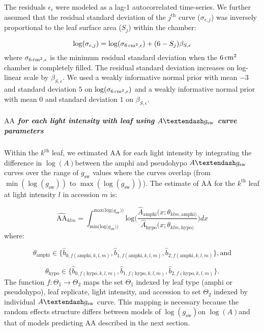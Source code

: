 \documentclass[
  letterpaper,
  DIV=11,
  numbers=noendperiod]{scrartcl}
\let\oldsubparagraph\subparagraph
\renewcommand{\subparagraph}[1]{\oldsubparagraph{#1}\mbox{}}
\newcommand{\aax}{$\mathrm{AA}$}
\newcommand{\agcurve}{$A \textendash g_\text{sw}$}
\newcommand{\gsw}{$g_\text{sw}$}
\newcommand{\loggsw}{$\log(g_\text{sw})$}
\newcommand{\logA}{$\log(A)$}
\begin{document}
The residuals \(\epsilon_{i}\) were modeled as a lag-1 autocorrelated
time-series. We further assumed that the residual standard deviation of
the \(j^{\text{th}}\) curve (\(\sigma_{\epsilon,j}\)) was inversely
proportional to the leaf surface area (\(S_j\)) within the chamber:

\[\log (\sigma_{\epsilon,j}) = \log (\sigma_{\qty{6}{\raiseto{2}\centi\meter},\epsilon}) + (6 - S_j) \beta_{S,\epsilon}\]
where \(\sigma_{\qty{6}{\raiseto{2}\centi\meter},\epsilon}\) is the
minimum residual standard deviation when the
\(\qty{6}{\raiseto{2}\centi\meter}\) chamber is completely filled. The
residual standard deviation increases on log-linear scale by
\(\beta_{S,\epsilon}\). We used a weakly informative normal prior with
mean \(-3\) and standard deviation \(5\) on
\(\log (\sigma_{\qty{6}{\raiseto{2}\centi\meter},\epsilon})\) and a
weakly informative normal prior with mean \(0\) and standard deviation
\(1\) on \(\beta_{S,\epsilon}\).

\subparagraph{\texorpdfstring{\aax{} for each light intensity with leaf
using \agcurve{} curve
parameters}{ for each light intensity with leaf using  curve parameters}}\label{for-each-light-intensity-with-leaf-using-curve-parameters}

Within the \(k^{\text{th}}\) leaf, we estimated \aax{} for each light
intensity by integrating the difference in \logA between the amphi and
pseudohypo \agcurve{} curves over the range of \gsw{} values where the
curves overlap (from \(\min(\log(g_\text{sw}))\) to
\(\max(\log(g_\text{sw}))\)). The estimate of \aax{} for the
\(k^{\text{th}}\) leaf at light intensity \(l\) in accession \(m\) is:

\[\widehat{\mathrm{AA}}_{klm} = \int_{\text{min(log(}g_\text{sw}))}^{\text{max(log(}g_\text{sw}))} \text{log}\bigg(\frac{\hat{A}_\text{amphi}(x; \theta_{klm,\text{amphi})}}{\hat{A}_\text{hypo}(x; \theta_{klm,\text{hypo})}}\bigg) dx\]
where:

\[\theta_\text{amphi} \in \{\hat{b}_{0, f(\text{amphi}, k,l,m)}, \hat{b}_{1, f(\text{amphi}, k,l,m)}, \hat{b}_{2, f(\text{amphi}, k,l,m)}\}, \text{and}\]

\[\theta_\text{hypo} \in \{\hat{b}_{0, f(\text{hypo}, k,l,m)}, \hat{b}_{1, f(\text{hypo}, k,l,m)}, \hat{b}_{2, f(\text{hypo}, k,l,m)}\}.\]
The function \(f : \Theta_1 \rightarrow \Theta_2\) maps the set
\(\Theta_1\) indexed by leaf type (amphi or pseudohypo), leaf replicate,
light intensity, and accession to set \(\Theta_2\) indexed by individual
\agcurve{} curve. This mapping is necessary because the random effects
structure differs between models of \loggsw on \logA and that of models
predicting \aax{} described in the next section.
\end{document}
